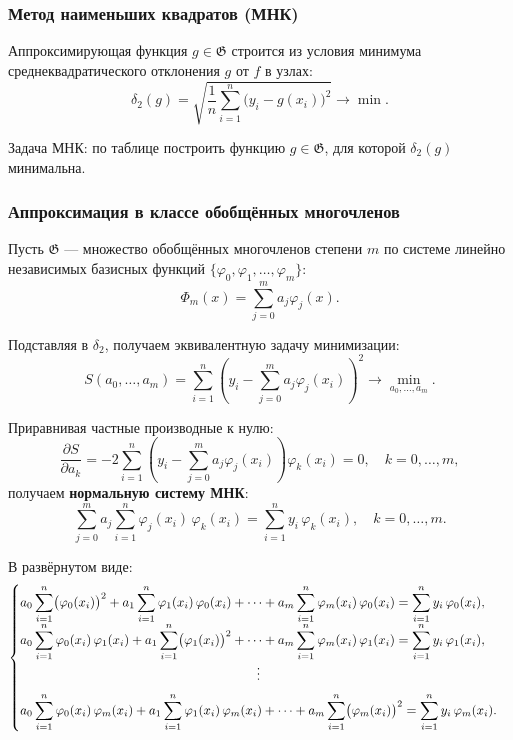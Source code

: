 \subsubsection*{Метод наименьших квадратов (МНК)}

Аппроксимирующая функция $g \in \mathfrak{G}$ строится из условия минимума среднеквадратического отклонения $g$ от $f$ в узлах:
\[
    \delta_2(g) = \sqrt{\frac{1}{n} \sum_{i=1}^{n} \bigl(y_i - g(x_i)\bigr)^2} \longrightarrow \min.
\]

Задача МНК: по таблице построить функцию $g \in \mathfrak{G}$, для которой $\delta_2(g)$ минимальна.

\subsubsection*{Аппроксимация в классе обобщённых многочленов}

Пусть $\mathfrak{G}$ --- множество обобщённых многочленов степени $m$ по системе линейно независимых базисных функций $\{\varphi_0, \varphi_1, \ldots, \varphi_m\}$:
\[
    \Phi_m(x) = \sum_{j=0}^{m} a_j \varphi_j(x).
\]

Подставляя в $\delta_2$, получаем эквивалентную задачу минимизации:
\[
    S(a_0, \ldots, a_m) = \sum_{i=1}^{n} \left(y_i - \sum_{j=0}^{m} a_j \varphi_j(x_i)\right)^2 \longrightarrow \min_{a_0, \ldots, a_m}.
\]

Приравнивая частные производные к нулю:
\[
    \frac{\partial S}{\partial a_k} = -2 \sum_{i=1}^{n} \left(y_i - \sum_{j=0}^{m} a_j \varphi_j(x_i)\right) \varphi_k(x_i) = 0, \quad k = 0, \ldots, m,
\]
получаем \textbf{нормальную систему МНК}:
\[
    \sum_{j=0}^{m} a_j \sum_{i=1}^{n} \varphi_j(x_i)\,\varphi_k(x_i) = \sum_{i=1}^{n} y_i\,\varphi_k(x_i), \quad k = 0, \ldots, m.
\]

В развёрнутом виде:
\[
    \begin{cases}
        \displaystyle a_0 \sum_{i=1}^{n} \bigl(\varphi_0(x_i)\bigr)^2 + a_1 \sum_{i=1}^{n} \varphi_1(x_i)\,\varphi_0(x_i) + \cdots + a_m \sum_{i=1}^{n} \varphi_m(x_i)\,\varphi_0(x_i) = \sum_{i=1}^{n} y_i\,\varphi_0(x_i), \\[6pt]
        \displaystyle a_0 \sum_{i=1}^{n} \varphi_0(x_i)\,\varphi_1(x_i) + a_1 \sum_{i=1}^{n} \bigl(\varphi_1(x_i)\bigr)^2 + \cdots + a_m \sum_{i=1}^{n} \varphi_m(x_i)\,\varphi_1(x_i) = \sum_{i=1}^{n} y_i\,\varphi_1(x_i), \\[6pt]
        \hfill\vdots\hfill \\[6pt]
        \displaystyle a_0 \sum_{i=1}^{n} \varphi_0(x_i)\,\varphi_m(x_i) + a_1 \sum_{i=1}^{n} \varphi_1(x_i)\,\varphi_m(x_i) + \cdots + a_m \sum_{i=1}^{n} \bigl(\varphi_m(x_i)\bigr)^2 = \sum_{i=1}^{n} y_i\,\varphi_m(x_i).
    \end{cases}
\]

